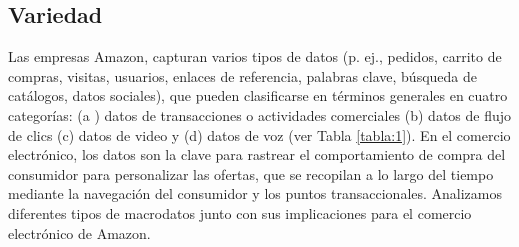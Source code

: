 \subsection{Variedad}
Las empresas Amazon, capturan varios tipos de datos (p. ej., pedidos, carrito de compras, visitas, usuarios, enlaces de referencia, palabras clave, búsqueda de catálogos, datos sociales), que pueden clasificarse en términos generales en cuatro categorías: (a ) datos de transacciones o actividades comerciales (b) datos de flujo de clics (c) datos de video y (d) datos de voz (ver Tabla \ref{tabla:1}). En el comercio electrónico, los datos son la clave para rastrear el comportamiento de compra del consumidor para personalizar las ofertas, que se recopilan a lo largo del tiempo mediante la navegación del consumidor y los puntos transaccionales. Analizamos  diferentes tipos de macrodatos junto con sus implicaciones para el comercio electrónico de Amazon.


